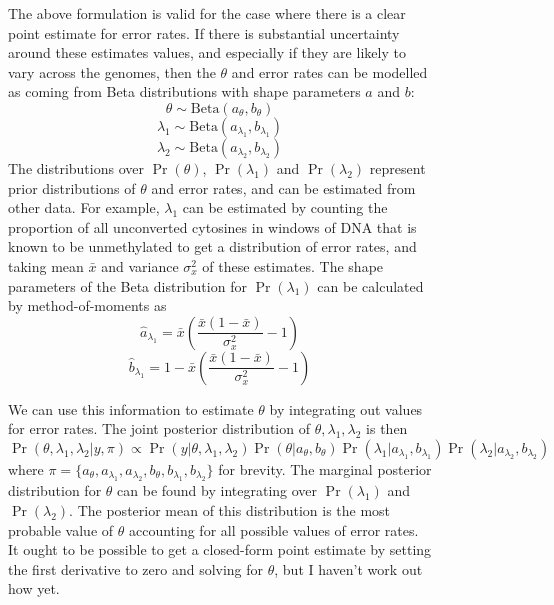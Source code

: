 \documentclass[12pt,longbibliography]{article}
\begin{document}
\begin{figure}
The above formulation is valid for the case where there is a clear point estimate for error rates.
If there is substantial uncertainty around these estimates values, and especially if they are likely to vary across the genomes, then the $\theta$ and error rates can be modelled as coming from Beta distributions with shape parameters $a$ and $b$:
\begin{equation}
    \theta \sim \textrm{Beta}(a_{\theta}, b_{\theta})
\end{equation}
\begin{equation}
    \lambda_1 \sim \textrm{Beta}(a_{\lambda_1}, b_{\lambda_1})
\end{equation}
\begin{equation}
    \lambda_2 \sim \textrm{Beta}(a_{\lambda_2}, b_{\lambda_2})
\end{equation}
The distributions over $\Pr(\theta)$, $\Pr(\lambda_1)$ and $\Pr(\lambda_2)$ represent prior distributions of $\theta$ and error rates, and can be estimated from other data.
For example, $\lambda_1$ can be estimated by counting the proportion of all unconverted cytosines in windows of DNA that is known to be unmethylated to get a distribution of error rates, and taking mean $\bar{x}$ and variance $\sigma^2_x$ of these estimates.
The shape parameters of the Beta distribution for $\Pr(\lambda_1)$ can be calculated by method-of-moments as
\begin{equation}
    \hat{a}_{\lambda_1} = \bar{x}(\frac{\bar{x}(1-\bar{x})}{\sigma^2_x}-1)
\end{equation}
\begin{equation}
    \hat{b}_{\lambda_1} = 1-\bar{x}(\frac{\bar{x}(1-\bar{x})}{\sigma^2_x}-1) 
\end{equation}

We can use this information to estimate $\theta$ by integrating out values for error rates.
The joint posterior distribution of $\theta, \lambda_1, \lambda_2$ is then
\begin{equation}
    \Pr(\theta, \lambda_1, \lambda_2 | y, \pi)
    \propto 
    \Pr(y | \theta, \lambda_1, \lambda_2)
    \Pr(\theta | a_{\theta}, b_{\theta})
    \Pr(\lambda_1 | a_{\lambda_1}, b_{\lambda_1})
    \Pr(\lambda_2 | a_{\lambda_2}, b_{\lambda_2})
\end{equation}
where $\pi=\{a_{\theta}, a_{\lambda_1}, a_{\lambda_2}, b_{\theta}, b_{\lambda_1}, b_{\lambda_2}\}$ for brevity.
The marginal posterior distribution for $\theta$ can be found by integrating over $\Pr(\lambda_1)$ and $\Pr(\lambda_2)$.
The posterior mean of this distribution is the most probable value of $\theta$ accounting for all possible values of error rates. It ought to be possible to get a closed-form point estimate by setting the first derivative to zero and solving for $\theta$, but I haven't work out how yet.


\end{figure}
\end{document}
